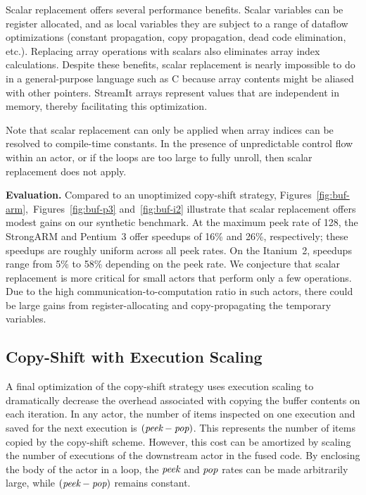 Scalar replacement offers several performance benefits. Scalar
variables can be register allocated, and as local variables they are
subject to a range of dataflow optimizations (constant propagation,
copy propagation, dead code elimination, etc.).  Replacing array
operations with scalars also eliminates array index calculations.
Despite these benefits, scalar replacement is nearly impossible to do
in a general-purpose language such as C because array contents might
be aliased with other pointers.  StreamIt arrays represent values that
are independent in memory, thereby facilitating this optimization.

Note that scalar replacement can only be applied when array indices
can be resolved to compile-time constants.  In the presence of unpredictable
control flow within an actor, or if the loops are too large to fully unroll,
then scalar replacement does not apply.

{\bf Evaluation.}  Compared to an unoptimized copy-shift strategy,
Figures~\ref{fig:buf-arm},~Figures~\ref{fig:buf-p3}
and~\ref{fig:buf-i2} illustrate that scalar replacement offers
modest gains on our synthetic benchmark.  At the maximum peek rate of
128, the StrongARM and Pentium~3 offer speedups of 16\% and 26\%,
respectively; these speedups are roughly uniform across all peek rates.
On the Itanium~2, speedups range from 5\% to 58\% depending on the
peek rate.  We conjecture that scalar replacement is more critical for
small actors that perform only a few operations.  Due to the high
communication-to-computation ratio in such actors, there could be
large gains from register-allocating and copy-propagating the
temporary variables.

\subsection{Copy-Shift with Execution Scaling}

A final optimization of the copy-shift strategy uses execution scaling
to dramatically decrease the overhead associated with copying the
buffer contents on each iteration.  In any actor, the number of items
inspected on one execution and saved for the next
execution is $(\mbox{\it peek} - \mbox{\it pop})$.  This represents
the number of items copied by the copy-shift scheme.  However, this
cost can be amortized by scaling the number of executions of the
downstream actor in the fused code.  By enclosing the body of the
actor in a loop, the $\mbox{\it peek}$ and $\mbox{\it pop}$ rates can
be made arbitrarily large, while $(\mbox{\it peek} - \mbox{\it pop})$
remains constant.

